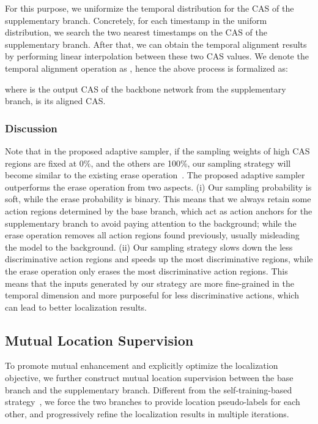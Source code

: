 \documentclass[journal]{IEEEtran}
\begin{document}
For this purpose, we uniformize the temporal distribution for the CAS of the supplementary branch. Concretely, for each timestamp in the uniform distribution, we search the two nearest timestamps on the CAS of the supplementary branch. After that, we can obtain the temporal alignment results by performing linear interpolation between these two CAS values. We denote the temporal alignment operation as , hence the above process is formalized as:

where  is the output CAS of the backbone network from the supplementary branch,  is its aligned CAS.



\subsubsection{\textbf{Discussion}}
Note that in the proposed adaptive sampler, if the sampling weights of high CAS regions are fixed at 0\%, and the others are 100\%, our sampling strategy will become similar to the existing erase operation~\cite{su2018cascaded,zhong2018step,zeng2019breaking,min2020adversarial}. The proposed adaptive sampler outperforms the erase operation from two aspects. (i) Our sampling probability is soft, while the erase probability is binary. This means that we always retain some action regions determined by the base branch, which act as action anchors for the supplementary branch to avoid paying attention to the background; while the erase operation removes all action regions found previously, usually misleading the model to the background. (ii) Our sampling strategy slows down the less discriminative action regions and speeds up the most discriminative regions, while the erase operation only erases the most discriminative action regions. This means that the inputs generated by our strategy are more fine-grained in the temporal dimension and more purposeful for less discriminative actions, which can lead to better localization results.



\subsection{Mutual Location Supervision}
To promote mutual enhancement and explicitly optimize the localization objective, we further construct mutual location supervision between the base branch and the supplementary branch. Different from the self-training-based strategy~\cite{pardo2021refineloc,zhai2020two,luo2020weakly}, we force the two branches to provide location pseudo-labels for each other, and progressively refine the localization results in multiple iterations.
\end{document}

